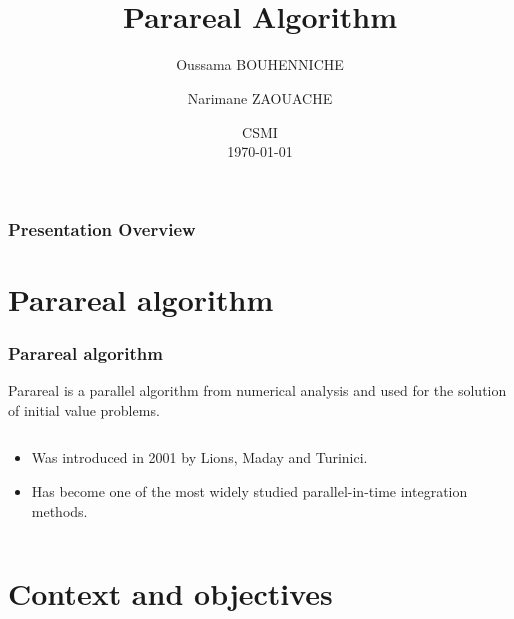 \documentclass[
	11pt,
]{beamer}
\title[Parareal Algorithm]{\\ \textbf{Parareal Algorithm}}
\author[O. BOUHENNICHE \and N. ZAOUACHE]{Oussama BOUHENNICHE \and Narimane ZAOUACHE}
\institute[]{University of Strasbourg}
\date[\today]{ CSMI \\ \today}
\begin{document}

\begin{frame}
	\titlepage
\end{frame}


\begin{frame}
	\frametitle{Presentation Overview}

	\tableofcontents
\end{frame}


\section{Parareal algorithm}

\begin{frame}
	\frametitle{Parareal algorithm}
	Parareal is a parallel algorithm from numerical analysis and used for
	the solution of initial value problems\cite{lions2001resolution}.

	\begin{columns}[c]
		\begin{column}{\textwidth}
			\begin{itemize}
				\item Was introduced in 2001 by Lions, Maday and Turinici.
				\item Has become one of the most widely studied parallel-in-time integration methods.
			\end{itemize}
		\end{column}
	\end{columns}

\end{frame}


\section{Context and objectives}
\end{document}
